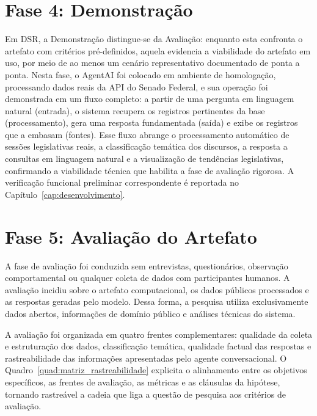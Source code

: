 \section{Fase 4: Demonstração}

Em DSR, a Demonstração distingue-se da Avaliação: enquanto esta confronta o artefato com critérios pré-definidos, aquela evidencia a viabilidade do artefato em uso, por meio de ao menos um cenário representativo documentado de ponta a ponta. Nesta fase, o AgentAI foi colocado em ambiente de homologação, processando dados reais da API do Senado Federal, e sua operação foi demonstrada em um fluxo completo: a partir de uma pergunta em linguagem natural (entrada), o sistema recupera os registros pertinentes da base (processamento), gera uma resposta fundamentada (saída) e exibe os registros que a embasam (fontes). Esse fluxo abrange o processamento automático de sessões legislativas reais, a classificação temática dos discursos, a resposta a consultas em linguagem natural e a visualização de tendências legislativas, confirmando a viabilidade técnica que habilita a fase de avaliação rigorosa. A verificação funcional preliminar correspondente é reportada no Capítulo~\ref{cap:desenvolvimento}.

\section{Fase 5: Avaliação do Artefato}

A fase de avaliação foi conduzida sem entrevistas, questionários, observação comportamental ou qualquer coleta de dados com participantes humanos. A avaliação incidiu sobre o artefato computacional, os dados públicos processados e as respostas geradas pelo modelo. Dessa forma, a pesquisa utiliza exclusivamente dados abertos, informações de domínio público e análises técnicas do sistema.

A avaliação foi organizada em quatro frentes complementares: qualidade da coleta e estruturação dos dados, classificação temática, qualidade factual das respostas e rastreabilidade das informações apresentadas pelo agente conversacional. O Quadro~\ref{quad:matriz_rastreabilidade} explicita o alinhamento entre os objetivos específicos, as frentes de avaliação, as métricas e as cláusulas da hipótese, tornando rastreável a cadeia que liga a questão de pesquisa aos critérios de avaliação.

